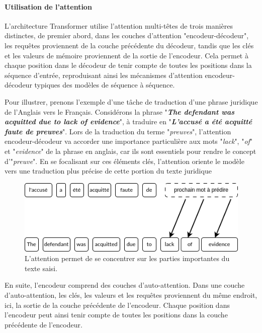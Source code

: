 \paragraph{Utilisation de l'attention} \hspace{0pt}

L'architecture Transformer utilise l'attention multi-têtes de trois manières distinctes, de premier abord, dans les couches d'attention "encodeur-décodeur", les requêtes proviennent de la couche précédente du décodeur, tandis que les clés et les valeurs de mémoire proviennent de la sortie de l'encodeur. Cela permet à chaque position dans le décodeur de tenir compte de toutes les positions dans la séquence d'entrée, reproduisant ainsi les mécanismes d'attention encodeur-décodeur typiques des modèles de séquence à séquence.

Pour illustrer, prenons l'exemple d'une tâche de traduction d'une phrase juridique de l'Anglais vers le Français. Considérons la phrase "\textit{\textbf{The defendant was acquitted due to lack of evidence}}", à traduire en "\textit{\textbf{L'accusé a été acquitté faute de preuves}}". Lors de la traduction du terme "\textit{preuves}", l'attention encodeur-décodeur va accorder une importance particulière aux mots "\textit{lack}", "\textit{of}" et "\textit{evidence}" de la phrase en anglais, car ils sont essentiels pour rendre le concept d'"\textit{preuve}". En se focalisant sur ces éléments clés, l'attention oriente le modèle vers une traduction plus précise de cette portion du texte juridique

\begin{figure}[H]
    \centering
    \includegraphics[width=14cm]{gfx/figure-cross-attention-machanism.png}
    \caption[]{L'attention permet de se concentrer sur les parties importantes du texte saisi.}
    \label{fig:cross-attention-mechanism}
\end{figure}

En suite, l'encodeur comprend des couches d'auto-attention. Dans une couche d'auto-attention, les clés, les valeurs et les requêtes proviennent du même endroit, ici, la sortie de la couche précédente de l'encodeur. Chaque position dans l'encodeur peut ainsi tenir compte de toutes les positions dans la couche précédente de l'encodeur.

